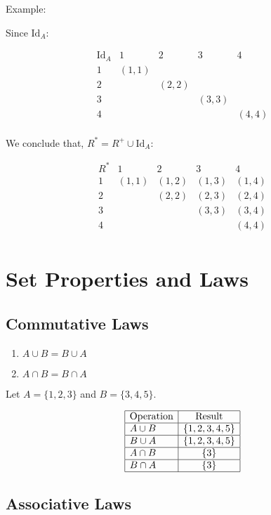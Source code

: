 \documentclass[12pt,a4paper,openany]{article}
\begin{document}
Example:

Since $\text{Id}_A$:

$$
\begin{array}{c|cccc}
\text{Id}_A & 1 & 2 & 3 & 4 \\
\hline
1 & (1,1) & & & \\
2 & & (2,2) & & \\
3 & & & (3,3) & \\
4 & & & & (4,4) \\
\end{array}
$$

We conclude that,
$
R^* = R^+ \cup \text{Id}_A
$:

$$
\begin{array}{c|cccc}
R^* & 1 & 2 & 3 & 4 \\
\hline
1 & (1,1) & (1,2) & (1,3) & (1,4) \\
2 & & (2,2) & (2,3) & (2,4) \\
3 & & & (3,3) & (3,4) \\
4 & & & & (4,4) \\
\end{array}
$$

\section{Set Properties and Laws}

\subsection{Commutative Laws}

\begin{enumerate}
    \item $A \cup B = B \cup A$
    \item $A \cap B = B \cap A$
\end{enumerate}

Let $A = \{1, 2, 3\}$ and $B = \{3, 4, 5\}$.

\[
\begin{array}{|l|c|}
\hline
\text{Operation} & \text{Result} \\ \hline
A \cup B & \{1, 2, 3, 4, 5\} \\ \hline
B \cup A & \{1, 2, 3, 4, 5\} \\ \hline
A \cap B & \{3\} \\ \hline
B \cap A & \{3\} \\ \hline
\end{array}
\]


\subsection{Associative Laws}
\end{document}
